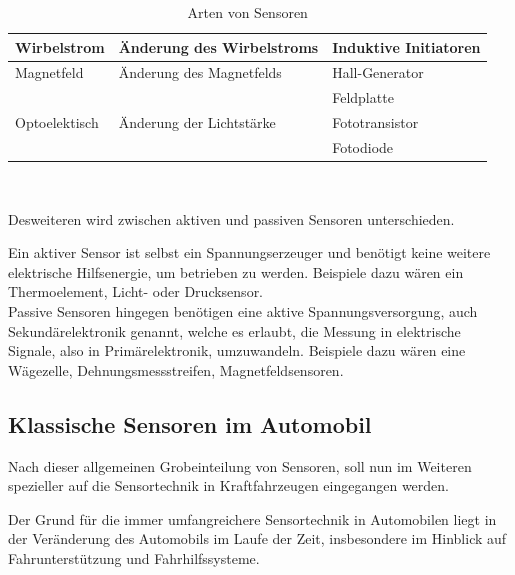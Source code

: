 \begin{flushleft}
\begin{table}[h]
\begin{tabularx}{\textwidth}{l|l|l}
	                    Wirbelstrom & Änderung des Wirbelstroms & Induktive Initiatoren\\
	                    \hline
	                    
	                    Magnetfeld & Änderung des Magnetfelds & Hall-Generator\\
	                    && Feldplatte\\
	                    \hline
	
	                    Optoelektisch & Änderung der Lichtstärke & Fototransistor\\
	                    && Fotodiode\\
	                    
	
	                \end{tabularx}\\
	                \caption{Arten von Sensoren}
	                \label{fig:TS09}
	            \end{table}
	         	
	                	Desweiteren wird zwischen aktiven und passiven Sensoren unterschieden. 
	                	
	                	Ein aktiver Sensor ist selbst ein Spannungserzeuger und benötigt keine weitere elektrische Hilfsenergie, um betrieben zu werden. Beispiele dazu wären ein Thermoelement, Licht- oder Drucksensor.\\
	                	
	                	Passive Sensoren hingegen benötigen eine aktive Spannungsversorgung, auch Sekundärelektronik genannt, welche es erlaubt, die Messung in elektrische Signale, also in Primärelektronik, umzuwandeln. Beispiele dazu wären eine Wägezelle, Dehnungsmessstreifen, Magnetfeldsensoren.		
	                	
	                                        
	\subsection{Klassische Sensoren im Automobil} 
	       
	    Nach dieser allgemeinen Grobeinteilung von Sensoren, soll nun im Weiteren spezieller auf die Sensortechnik in Kraftfahrzeugen eingegangen werden.
	
	    Der Grund für die immer umfangreichere Sensortechnik in Automobilen liegt in der Veränderung des Automobils im Laufe der Zeit, insbesondere im Hinblick auf Fahrunterstützung und Fahrhilfssysteme.
	     	

\end{flushleft}
